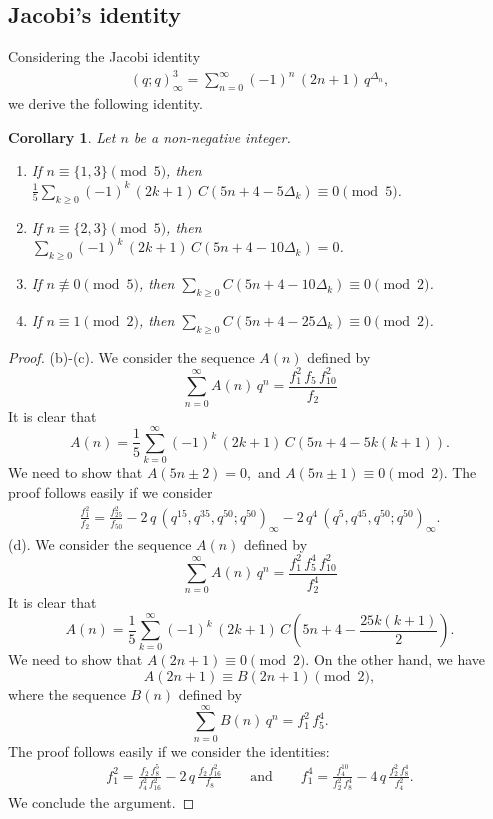 \documentclass{article}
\newtheorem{corollary}[theorem]{Corollary}
\begin{document}
\subsection{Jacobi's identity}

Considering the Jacobi identity \cite[Eq. (0.46), p. 17]{Cooper}
\begin{align*}
(q;q)_\infty^3 = \sum_{n=0}^\infty (-1)^n\,(2n+1)\,q^{\Delta_n},
\end{align*}
we derive the following identity.

\medskip


\begin{corollary} \label{Cor5} Let $n$ be a non-negative integer.
\begin{enumerate}
    \item [(a)] If $n\equiv \{1,3\} \pmod 5$, then $\frac15\sum\limits_{k\geq0} (-1)^k\, (2k+1)\, C(5n+4-5\Delta_k) \equiv 0 \pmod 5$.
    \item [(b)] If $n\equiv \{2,3\} \pmod 5$, then $\sum\limits_{k\geq0} (-1)^k\, (2k+1)\, C(5n+4-10\Delta_k) =0$.
    \item [(c)] If $n\not\equiv 0 \pmod 5$, then $\sum\limits_{k\geq0} C(5n+4-10\Delta_k)\equiv 0 \pmod 2$.
    \item [(d)] If $n\equiv 1 \pmod 2$, then $\sum\limits_{k\geq0} C(5n+4-25\Delta_k) \equiv 0 \pmod 2$.
\end{enumerate}
\end{corollary}
\medskip

\begin{proof}
	(b)-(c). 	We consider the sequence $A(n)$ defined by
	$$
	\sum_{n=0}^\infty A(n)\,q^n = \frac{f_1^2\,f_5\,f_{10}^2}{f_2}
	$$
	It is clear that
	$$
	A(n)=\frac{1}{5} \sum_{k=0}^\infty (-1)^k\,(2k+1)\, C\left(5n+4-5k(k+1)\right).
	$$
	We need to show that
	$
	A(5n \pm 2)  = 0,
	$
	and
	$
	A(5n \pm 1) \equiv 0 \pmod 2.
	$
	The proof follows easily if we consider
	\begin{align*}
	\frac{f_1^2}{f_2} = \frac{f_{25}^2}{f_{50}}-2\,q\,(q^{15},q^{35},q^{50};q^{50})_\infty -2\,q^4\, (q^5,q^{45},q^{50};q^{50})_\infty.
	\end{align*}
		(d). 	We consider the sequence $A(n)$ defined by
	$$
	\sum_{n=0}^\infty A(n)\,q^n = \frac{f_1^2\,f_5^4\,f_{10}^2}{f_2^4}
	$$
	It is clear that
	$$
	A(n)=\frac{1}{5} \sum_{k=0}^\infty (-1)^k\,(2k+1)\, C\left(5n+4-\frac{25k(k+1)}{2}\right).
	$$
	We need to show that
	$
	A(2n+1) \equiv 0 \pmod 2.
	$
	On the other hand, we have
	$$
	A(2n+1) \equiv B(2n+1) \pmod 2,
	$$
	where the sequence $B(n)$ defined by
	$$
	\sum_{n=0}^\infty B(n)\,q^n = f_1^2\,f_5^4.
	$$
	The proof follows easily if we consider the identities:
	\begin{align*}
	f_1^2 = \frac{f_2\,f_8^5}{f_4^2\,f_{16}^2}-2\,q\,\frac{f_2\,f_{16}^2}{f_8} \qquad \text{and} \qquad
	f_1^4 = \frac{f_4^{10}}{f_2^2\,f_{8}^4}-4\,q\,\frac{f_2^2\,f_{8}^4}{f_4^2}.
	\end{align*}
We conclude the argument.
\end{proof}
\end{document}
